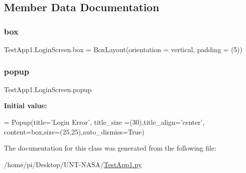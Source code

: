 \subsection{Member Data Documentation}
\mbox{\label{classTestApp1_1_1LoginScreen_ad9ee7d178fec4c941960ebf2e5ce8239}} 
\subsubsection{\texorpdfstring{box}{box}}
{\footnotesize\ttfamily Test\+App1.\+Login\+Screen.\+box = Box\+Layout(orientation = \textquotesingle{}vertical\textquotesingle{}, padding = (5))\hspace{0.3cm}{\ttfamily [static]}}

\mbox{\label{classTestApp1_1_1LoginScreen_ab64836ea6220beb4d6141a08d1c1cdb6}} 
\subsubsection{\texorpdfstring{popup}{popup}}
{\footnotesize\ttfamily Test\+App1.\+Login\+Screen.\+popup\hspace{0.3cm}{\ttfamily [static]}}

{\bfseries Initial value\+:}
\begin{DoxyCode}
=  Popup(title=\textcolor{stringliteral}{'Login Error'},
                          title\_size =(30),title\_align=\textcolor{stringliteral}{'center'},
                          content=box,size=(25,25),auto\_dismiss=\textcolor{keyword}{True})
\end{DoxyCode}


The documentation for this class was generated from the following file\+:\begin{DoxyCompactItemize}
\item 
/home/pi/\+Desktop/\+U\+N\+T-\/\+N\+A\+S\+A/\hyperlink{TestApp1_8py}{Test\+App1.\+py}\end{DoxyCompactItemize}

